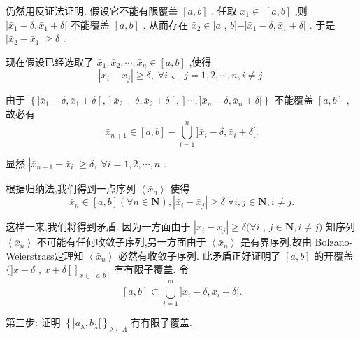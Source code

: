 仍然用反证法证明. 假设它不能有限覆盖 $\left\lbrack  {a,b}\right\rbrack$ . 任取 ${x}_{1} \in$  $\left\lbrack  {a,b}\right\rbrack$ ,则 $\rbrack {\bar{x}}_{1} - \delta ,{\bar{x}}_{1} + \delta \lbrack$ 不能覆盖 $\left\lbrack  {a,b}\right\rbrack$ . 从而存在 ${\bar{x}}_{2} \in  \lbrack a$ , $b\rbrack  - \rbrack {\bar{x}}_{1} - \delta ,{\bar{x}}_{1} + \delta \lbrack$ . 于是 $\left| {{\bar{x}}_{2} - {\bar{x}}_{1}}\right|  \geq  \delta$ .

现在假设已经选取了 ${\bar{x}}_{1},{\bar{x}}_{2},\cdots ,{\bar{x}}_{n} \in  \left\lbrack  {a,b}\right\rbrack$ ,使得
$$\left| {{\bar{x}}_{i} - {\bar{x}}_{j}}\right|  \geq  \delta ,\;\forall i\text{ 、 }j = 1,2,\cdots ,n,i \neq  j.$$

由于 $\left\{  {\rbrack {\bar{x}}_{1} - \delta ,{\bar{x}}_{1} + \delta \left\lbrack  ,\right\rbrack  {\bar{x}}_{2} - \delta ,{\bar{x}}_{2} + \delta \left\lbrack  ,\right\rbrack  \cdots ,\rbrack {\bar{x}}_{n} - \delta ,{\bar{x}}_{n} + \delta \lbrack }\right\}$ 不能覆盖 $\left\lbrack  {a,b}\right\rbrack$ ,故必有
$${\bar{x}}_{n + 1} \in  \left\lbrack  {a,b}\right\rbrack   - \mathop{\bigcup }\limits_{{i = 1}}^{n}\rbrack {\bar{x}}_{i} - \delta ,{\bar{x}}_{i} + \delta \lbrack .$$

显然 $\left| {{\bar{x}}_{n + 1} - {\bar{x}}_{i}}\right|  \geq  \delta ,\;\forall i = 1,2,\cdots ,n$ .

根据归纳法,我们得到一点序列 $\left\langle  {\bar{x}}_{n}\right\rangle$ 使得
$${\bar{x}}_{n} \in  \left\lbrack  {a,b}\right\rbrack  \left( {\forall n \in  \mathbf{N}}\right) ,\left| {{\bar{x}}_{i} - {\bar{x}}_{j}}\right|  \geq  \delta \;\forall i,j \in  \mathbf{N},i \neq  j.$$

这样一来,我们将得到矛盾. 因为一方面由于 $\left| {{\bar{x}}_{i} - {\bar{x}}_{j}}\right|  \geq  \delta (\forall i$ , $j \in  \mathbf{N},i \neq  j)$ 知序列 $\left\langle  {\bar{x}}_{n}\right\rangle$ 不可能有任何收敛子序列,另一方面由于 $\left\langle  {\bar{x}}_{n}\right\rangle$ 是有界序列,故由 Bolzano-Weierstrass定理知 $\left\langle  {\bar{x}}_{n}\right\rangle$ 必然有收敛子序列. 此矛盾正好证明了 $\left\lbrack  {a,b}\right\rbrack$ 的开覆盖 $\{ \rbrack x - \delta$ , $x + \delta {\left\lbrack  \right\rbrack  }_{x \in  \left\lbrack  {a;b}\right\rbrack  }$ 有有限子覆盖. 令
$$\left\lbrack  {a,b}\right\rbrack   \subset  \mathop{\bigcup }\limits_{{i = 1}}^{m}\rbrack {x}_{i} - \delta ,{x}_{i} + \delta \lbrack .$$

第三步: 证明 ${\left\{  \rbrack {a}_{\lambda },{b}_{\lambda }\lbrack \right\}  }_{\lambda  \in  \Lambda }$ 有有限子覆盖.

